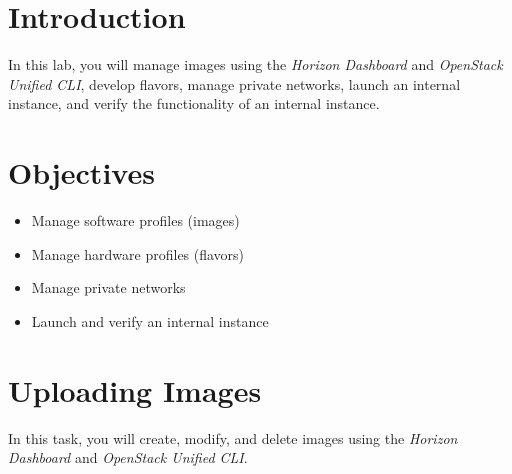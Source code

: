 \documentclass[letterpaper, 12pt]{article}
\begin{document}

\section*{Introduction}
\label{sec:introduction}
In this lab, you will manage images using the \textit{Horizon Dashboard} and \textit{OpenStack Unified CLI}, develop
flavors, manage private networks, launch an internal instance, and verify the functionality of an internal instance.

\section*{Objectives}
\label{sec:objectives}
\begin{itemize}[itemsep=0pt]
    \item Manage software profiles (images)
    \item Manage hardware profiles (flavors)
    \item Manage private networks
    \item Launch and verify an internal instance
\end{itemize}

\labsettings

\section{Uploading Images}
\label{sec:uploading_images}
In this task, you will create, modify, and delete images using the \textit{Horizon Dashboard} and
\textit{OpenStack Unified CLI}.
\end{document}
